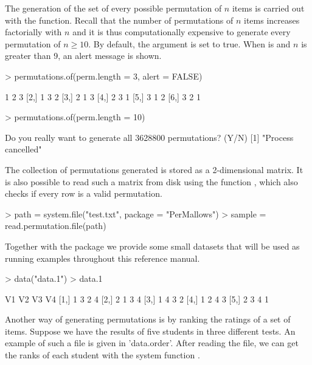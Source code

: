 \documentclass[article,nojss]{jss}
\begin{document}
The generation of the set of every possible permutation of $n$ items is carried out with the  function. Recall that the number of permutations of $n$ items increases factorially with $n$ and it is thus computationally expensive to generate every permutation of $n \ge 10$. By default, the  argument is set to true. When  is  and $n$ is greater than 9, an alert message is shown. 
\begin{Schunk}
\begin{Sinput}
> permutations.of(perm.length = 3, alert = FALSE)
\end{Sinput}
\begin{Soutput}
     [,1] [,2] [,3]
[1,]    1    2    3
[2,]    1    3    2
[3,]    2    1    3
[4,]    2    3    1
[5,]    3    1    2
[6,]    3    2    1
\end{Soutput}
\begin{Sinput}
> permutations.of(perm.length = 10)
\end{Sinput}
\begin{Soutput}
Do you really want to generate all  3628800  permutations? (Y/N)
[1] "Process cancelled"
\end{Soutput}
\end{Schunk}

The collection of permutations generated is stored as a 2-dimensional matrix. It is also possible to read such a matrix from disk using the function , which also checks if every row is a valid permutation. 
\begin{Schunk}
\begin{Sinput}
> path = system.file("test.txt", package = "PerMallows")
> sample = read.permutation.file(path)
\end{Sinput}
\end{Schunk}

Together with the  package we provide some small datasets that will be used as running examples throughout this reference manual. 
\begin{Schunk}
\begin{Sinput}
> data("data.1")
> data.1
\end{Sinput}
\begin{Soutput}
     V1 V2 V3 V4
[1,]  1  3  2  4
[2,]  2  1  3  4
[3,]  1  4  3  2
[4,]  1  2  4  3
[5,]  2  3  4  1
\end{Soutput}
\end{Schunk}

Another way of generating permutations is by ranking the ratings of a set of items. Suppose we have the results of five students in three different tests. An example of such a file is given in 'data.order'. After reading the file, we can get the ranks of each student with the system function .
\end{document}

